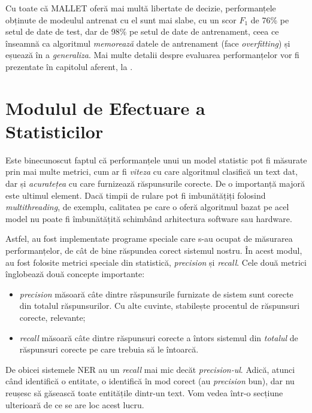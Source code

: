 Cu toate că MALLET oferă mai multă libertate de decizie, performanțele obținute de modeulul antrenat cu el sunt mai slabe, cu un scor $F_1$ de 76\% pe setul de date de test, dar de 98\% pe setul de date de antrenament, ceea ce înseamnă ca algoritmul \textit{memorează} datele de antrenament (face \textit{overfitting}) și eșuează în a \textit{generaliza}. Mai multe detalii despre evaluarea performanțelor vor fi prezentate în capitolul aferent, la .


\section{Modulul de Efectuare a Statisticilor}

Este binecunoscut faptul că performanțele unui un model statistic pot fi măsurate prin mai multe metrici, cum ar fi \textit{viteza} cu care algoritmul clasifică un text dat, dar și \textit{acuratețea} cu care furnizează răspunsurile corecte. De o importanță majoră este ultimul element. Dacă timpii de rulare pot fi imbunătățiți folosind \textit{multithreading}, de exemplu, calitatea pe care o oferă algoritmul bazat pe acel model nu poate fi îmbunătățită schimbând arhitectura software sau hardware.

Astfel, au fost implementate programe speciale care s-au ocupat de măsurarea performanțelor, de cât de bine răspundea corect sistemul nostru. În acest modul, au fost folosite metrici speciale din statistică, \textit{precision} și \textit{recall}. Cele două metrici înglobează două concepte importante:

\begin{itemize}
\item \textit{precision} măsoară câte dintre răspunsurile furnizate de sistem sunt corecte din totalul răspunsurilor. Cu alte cuvinte, stabilește procentul de răspunsuri corecte, relevante;

\item \textit{recall} măsoară câte dintre răspunsuri corecte a întors sistemul din \textit{totalul} de răspunsuri corecte pe care trebuia să le întoarcă.
\end{itemize}

De obicei sistemele NER au un \textit{recall} mai mic decăt \textit{precision-ul}. Adică, atunci când identifică o entitate, o identifică în mod corect (au \textit{precision} bun), dar nu reușesc să găsească toate entitățile dintr-un text. Vom vedea într-o secțiune ulterioară de ce se are loc acest lucru.

